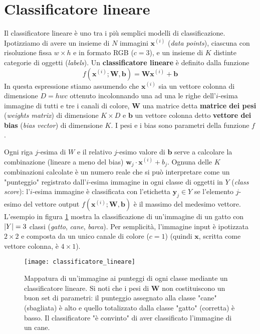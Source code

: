 \section{Classificatore lineare}
\label{classificatoreLineare}
Il classificatore lineare è uno tra i più semplici modelli di classificazione.
Ipotizziamo di avere un insieme di $N$ immagini $\mathbf{x}^{(i)}$ (\textit{data points}), ciascuna con risoluzione fissa $w\times h$ e in formato RGB ($c=3$), e un insieme di $K$ distinte categorie di oggetti  (\textit{labels}). Un \textbf{classificatore lineare} è definito dalla funzione
\begin{equation} \label{eq_class_lin}
f(\mathbf{x}^{(i)};\mathbf{W},\mathbf{b})=\mathbf{W}\mathbf{x}^{(i)}+\mathbf{b}
\end{equation}
In questa espressione stiamo assumendo che $\mathbf{x}^{(i)}$ sia un vettore colonna di dimensione $D=hwc$ ottenuto incolonnando una ad una le righe dell'$i$-esima immagine di tutti e tre i canali di colore, $\mathbf{W}$ una matrice detta \textbf{matrice dei pesi} (\textit{weights matrix}) di dimensione $K\times D$ e $\mathbf{b}$ un vettore colonna detto \textbf{vettore dei bias} (\textit{bias vector}) di dimensione $K$. I pesi e i bias sono parametri della funzione $f$.

Ogni riga $j$-esima di $W$ e il relativo $j$-esimo valore di $\mathbf{b}$ serve a calcolare la combinazione (lineare a meno del bias) $\mathbf{w}_j\cdot \mathbf{x}^{(i)}+b_j$. Ognuna delle $K$ combinazioni calcolate è un numero reale che si può interpretare come un "punteggio" registrato dall'$i$-esima immagine in ogni classe di oggetti in $Y$ (\textit{class score}): l'$i$-esima immagine è classificata con l'etichetta $\mathbf{y}_j\in Y$ se l'elemento $j$-esimo del vettore output $f(\mathbf{x}^{(i)};\mathbf{W},\mathbf{b})$ è il massimo del medesimo vettore.\\

L'esempio in figura \ref{class_lin} mostra la classificazione di un'immagine di un gatto con $\left|Y\right|=3$ classi (\textit{gatto}, \textit{cane}, \textit{barca}). Per semplicità, l'immagine input è ipotizzata $2\times 2$ e composta da un unico canale di colore ($c=1$) (quindi $\mathbf{x}$, scritta come vettore colonna, è $4\times 1$).

\begin{figure}[h!]
\centering
\texttt{[image: classificatore\_lineare]}
\caption{Mappatura di un'immagine ai punteggi di ogni classe mediante un classificatore lineare. Si noti che i pesi di $\mathbf{W}$ non costituiscono un buon set di parametri: il punteggio assegnato alla classe "cane" (sbagliata) è alto e quello totalizzato dalla classe "gatto" (corretta) è basso. Il classificatore "è convinto" di aver classificato l'immagine di un cane.}
\label{class_lin}
\end{figure}

